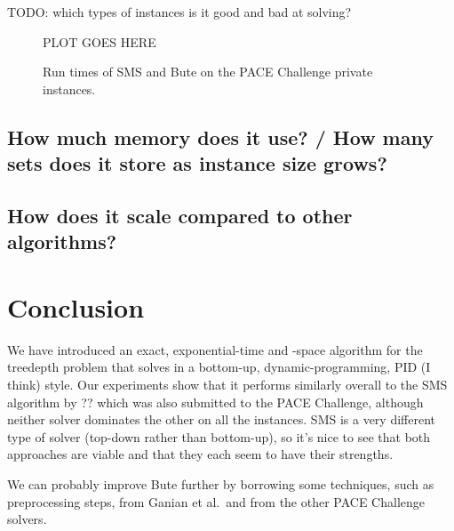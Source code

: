 TODO: which types of instances is it good and bad at solving?

\begin{figure}[htb]
  \centering
  PLOT GOES HERE
  \caption{Run times of SMS and Bute on the PACE Challenge private instances.}
  \label{fig:runtimes}
\end{figure}

\subsection{How much memory does it use? / How many sets does it store as instance size grows?}

\subsection{How does it scale compared to other algorithms?}

\section{Conclusion}\label{sec:conclusion}

We have introduced an exact, exponential-time and -space algorithm for the treedepth problem
that solves in a bottom-up, dynamic-programming, PID (I think) style.  Our experiments show that
it performs similarly overall to the SMS algorithm by ?? which was also submitted to the PACE Challenge,
although neither solver dominates the other on all the instances.   SMS is a very different type
of solver (top-down rather than bottom-up), so it's nice to see that both approaches are viable
and that they each seem to have their strengths.

We can probably improve Bute further by borrowing some techniques, such as preprocessing
steps, from Ganian et al.\ and from the other PACE Challenge solvers.
